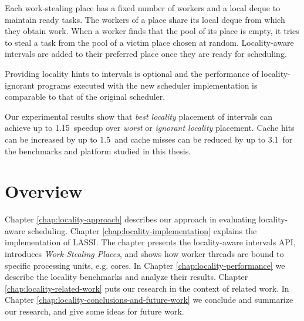 Each work-stealing place has a fixed number of workers and a local
deque to maintain ready tasks. The workers of a place share its local
deque from which they obtain work. When a worker finds that the pool
of its place is empty, it tries to steal a task from the pool of a
victim place chosen at random. Locality-aware intervals are added to
their preferred place once they are ready for scheduling.

Providing locality hints to intervals is optional and the performance
of locality-ignorant programs executed with the new scheduler
implementation is comparable to that of the original scheduler.

Our experimental results show that \emph{best locality} placement of
intervals can achieve up to 1.15\texttimes\ speedup over \emph{worst}
or \emph{ignorant locality} placement. Cache hits can be increased by
up to 1.5\texttimes\ and cache misses can be reduced by up to
3.1\texttimes\ for the benchmarks and platform studied in this thesis.



\section{Overview}
\label{sec:locality-introduction-locality-overview}

Chapter \ref{chap:locality-approach} describes our approach in
evaluating locality-aware scheduling. Chapter
\ref{chap:locality-implementation} explains the implementation of
LASSI. The chapter presents the locality-aware intervals API,
introduces \emph{Work-Stealing Places}, and shows how worker threads
are bound to specific processing units, e.g. cores.  In Chapter
\ref{chap:locality-performance} we describe the locality benchmarks
and analyze their results. Chapter \ref{chap:locality-related-work}
puts our research in the context of related work. In Chapter
\ref{chap:locality-conclusions-and-future-work} we conclude and
summarize our research, and give some ideas for future work.


